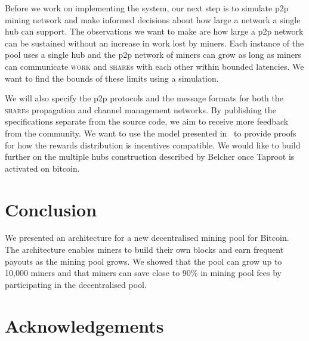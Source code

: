 \documentclass{article}
\begin{document}
Before we work on implementing the system, our next step is to
simulate p2p mining network and make informed decisions about how
large a network a single hub can support. The observations we want to
make are how large a p2p network can be sustained without an increase
in work lost by miners. Each instance of the pool uses a single hub
and the p2p network of miners can grow as long as miners can
communicate \textsc{work} and \textsc{share}s with each other within
bounded latencies. We want to find the bounds of these limits using a
simulation.

We will also specify the p2p protocols and the message formats for
both the \textsc{share}s propagation and channel management
networks. By publishing the specifications separate from the source
code, we aim to receive more feedback from the community. We want to
use the model presented in~\cite{incentives-compatible} to provide
proofs for how the rewards distribution is incentives compatible. We
would like to build further on the multiple hubs construction
described by Belcher once Taproot is activated on bitcoin.

\section{Conclusion}

We presented an architecture for a new decentralised mining pool for
Bitcoin. The architecture enables miners to build their own blocks and
earn frequent payouts as the mining pool grows. We showed that the
pool can grow up to 10,000 miners and that miners can save close to
90\% in mining pool fees by participating in the decentralised pool.

\section{Acknowledgements}


 

\end{document}
